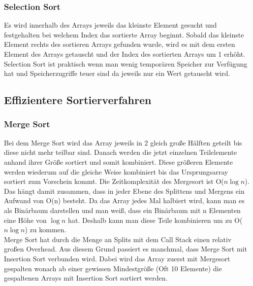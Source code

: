 \documentclass{article}
\begin{document}
	\subsubsection{Selection Sort}
	Es wird innerhalb des Arrays jeweils das kleinste Element gesucht und festgehalten bei welchem Index das sortierte Array beginnt. Sobald das kleinste Element rechts des sortieren Arrays gefunden wurde, wird es mit dem ersten Element des Arrays getauscht und der Index des sortierten Arrays um 1 erhöht. Selection Sort ist praktisch wenn man wenig temporären Speicher zur Verfügung hat und Speicherzugriffe teuer sind da jeweils nur ein Wert getauscht wird.
	\subsection{Effizientere Sortierverfahren}
	\subsubsection{Merge Sort}
	Bei dem Merge Sort wird das Array jeweils in 2 gleich große Hälften geteilt bis diese nicht mehr teilbar sind. Danach werden die jetzt einzelnen Teilelemente anhand ihrer Größe sortiert und somit kombiniert. Diese größeren Elemente werden wiederum auf die gleiche Weise kombiniert bis das Ursprungsarray sortiert zum Vorschein kommt. Die Zeitkomplexität des Mergesort ist O($n \log n$). Das hängt damit zusammen, dass in jeder Ebene des Splittens und Mergens ein Aufwand von O(n) besteht. Da das Array jedes Mal halbiert wird, kann man es als Binärbaum darstellen und man weiß, dass ein Binärbaum mit n Elementen eine Höhe von $\log n$ hat. Deshalb kann man diese Teile kombinieren um zu O($n \log n$) zu kommen. \\
	Merge Sort hat durch die Menge an Splits mit dem Call Stack einen relativ großen Overhead. Aus diesem Grund passiert es manchmal, dass Merge Sort mit Insertion Sort verbunden wird. Dabei wird das Array zuerst mit Mergesort gespalten wonach ab einer gewissen Mindestgröße (Oft 10 Elemente) die gespaltenen Arrays mit Insertion Sort sortiert werden.
\end{document}
